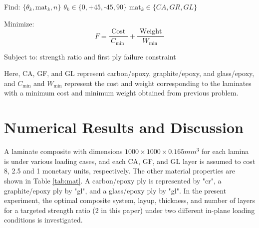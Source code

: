 \documentclass[USenglish,twocolumn]{article}
\begin{document}
Find: $\{\theta_k,\text{mat}_k, n\}$ $\theta_k \in \{ 0,\text{+}45,\text{-}45,90\}$ $\text{mat}_k \in \{CA, GR, GL \}$

Minimize:
\begin{equation}
	F=\frac{\text { Cost }}{C_{\text {min }}}+\frac{\text { Weight }}{W_{\text {min }}}
\end{equation}

Subject to: strength ratio and first ply failure constraint


Here, CA, GF, and GL represent carbon/epoxy, graphite/epoxy, and glass/epoxy, and
$C_{\text{min}}$ and $W_{\text{min}}$ represent the cost and
weight corresponding to the laminates with a minimum cost and minimum weight
obtained from previous problem.

\section{Numerical Results and Discussion}
A laminate composite with dimensions $1000 \times 1000 \times 0.165 mm^3$ for
each lamina is under various loading cases, and each CA, GF, and GL layer is
assumed to cost 8, 2.5 and 1 monetary units, respectively. The other
material properties are shown in Table \ref{tab:mat}. A carbon/epoxy ply is represented by "cr", a
graphite/epoxy ply by "gl", and a glass/epoxy ply by "gl".  In the present
experiment, the optimal composite system, layup, thickness, and number of
layers for a targeted strength ratio (2 in this paper) under two different
in-plane loading conditions is investigated.
\end{document}
